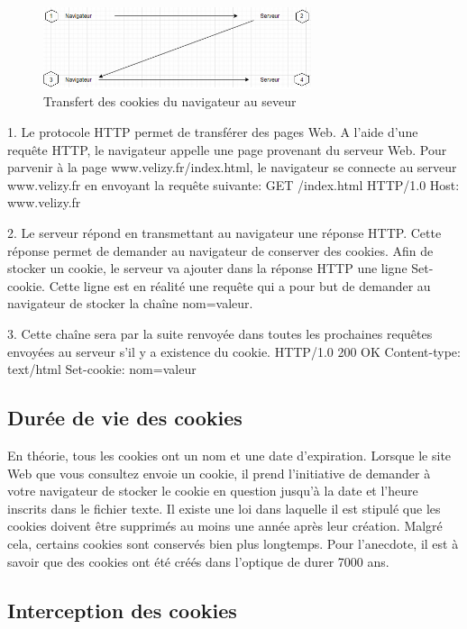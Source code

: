 \begin{figure}[htp!]
  \centering
  \setlength\figureheight{7cm}
  \setlength\figurewidth{9cm}
  \includegraphics[width=0.7\textwidth]{oui/Ancien/imangeancien/cookie/cookie2.PNG}
   \caption{Transfert des cookies du navigateur au seveur}
  \label{fig:courbe-tikz}
\end{figure}

1. Le protocole HTTP permet de transférer des pages Web. A l’aide d’une requête HTTP, le navigateur appelle une page provenant du serveur Web.
Pour parvenir à la page www.velizy.fr/index.html, le navigateur se connecte au serveur www.velizy.fr en envoyant la requête suivante:
GET /index.html HTTP/1.0
Host: www.velizy.fr

2. Le serveur répond en transmettant au navigateur une réponse HTTP.
Cette réponse permet de demander au navigateur de conserver des cookies.
Afin de stocker un cookie, le serveur va ajouter dans la réponse HTTP une ligne Set-cookie. Cette ligne est en réalité une requête qui a pour but de demander au navigateur de stocker la chaîne nom=valeur.

3. Cette chaîne sera par la suite renvoyée dans toutes les prochaines requêtes envoyées au serveur s'il y a existence du cookie.
HTTP/1.0 200 OK
Content-type: text/html
Set-cookie: nom=valeur

\subsection{Durée de vie des cookies}

En théorie, tous les cookies ont un nom et une date d’expiration. 
Lorsque le site Web que vous consultez envoie un cookie, il prend l’initiative de demander à votre navigateur de stocker le cookie en question jusqu’à la date et l’heure inscrits dans le fichier texte. Il existe une loi dans laquelle il est stipulé que les cookies doivent être supprimés au moins une année après leur création. Malgré cela, certains cookies sont conservés bien plus longtemps. Pour l’anecdote, il est à savoir que des cookies ont été créés dans l’optique de durer 7000 ans.

\subsection{Interception des cookies}

